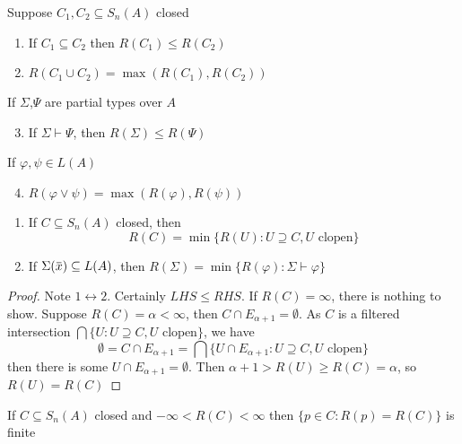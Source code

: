 \documentclass[11pt]{article}
\begin{document}
\begin{proposition}[]
Suppose \(C_1,C_2\subseteq S_n(A)\) closed
\begin{enumerate}
\item If \(C_1\subseteq C_2\) then \(R(C_1)\le R(C_2)\)
\item \(R(C_1\cup C_2)=\max(R(C_1),R(C_2))\)
\end{enumerate}
If \(\Sigma\),\(\Psi\) are partial types over \(A\)
\begin{enumerate}
\setcounter{enumi}{2}
\item If \(\Sigma\vdash\Psi\), then \(R(\Sigma)\le R(\Psi)\)
\end{enumerate}
If \(\varphi,\psi\in L(A)\)
\begin{enumerate}
\setcounter{enumi}{3}
\item \(R(\varphi\vee\psi)=\max(R(\varphi),R(\psi))\)
\end{enumerate}
\end{proposition}

\begin{proposition}[]
\begin{enumerate}
\item If \(C\subseteq S_n(A)\) closed, then
\begin{equation*}
R(C)=\min\{R(U):U\supseteq C,U\text{ clopen}\}
\end{equation*}
\item If \(\Sigma(\barx)\subseteq L(A)\), then \(R(\Sigma)=\min\{R(\varphi):\Sigma\vdash\varphi\}\)
\end{enumerate}
\end{proposition}

\begin{proof}
Note \(1\leftrightarrow 2\). Certainly \(LHS\le RHS\). If \(R(C)=\infty\), there is nothing to show.
Suppose \(R(C)=\alpha<\infty\), then \(C\cap E_{\alpha+1}=\emptyset\). As \(C\) is a filtered
intersection \(\bigcap\{U:U\supseteq C,U\text{ clopen}\}\), we have
\begin{equation*}
\emptyset=C\cap E_{\alpha+1}=\bigcap\{U\cap E_{\alpha+1}:U\supseteq C,U\text{ clopen}\}
\end{equation*}
then there is some \(U\cap E_{\alpha+1}=\emptyset\). Then \(\alpha+1>R(U)\ge R(C)=\alpha\), so \(R(U)=R(C)\)
\end{proof}

\begin{proposition}[]
\label{5.5.4.8}
If \(C\subseteq S_n(A)\) closed and \(-\infty<R(C)<\infty\) then \(\{p\in C:R(p)=R(C)\}\) is finite
\end{proposition}
\end{document}
